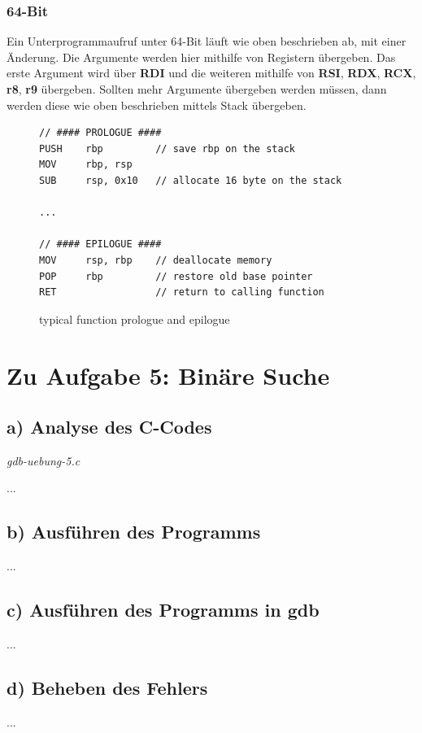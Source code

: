 \documentclass[12pt]{article}
\begin{document}
\subsubsection*{64-Bit}
Ein Unterprogrammaufruf unter 64-Bit läuft wie oben beschrieben ab, mit einer Änderung. Die Argumente werden hier mithilfe von Registern übergeben. Das erste Argument wird über \textbf{RDI} und die weiteren mithilfe von \textbf{RSI}, \textbf{RDX}, \textbf{RCX}, \textbf{r8}, \textbf{r9} übergeben. Sollten mehr Argumente übergeben werden müssen, dann werden diese wie oben beschrieben mittels Stack übergeben.


\begin{figure}[h]
\begin{lstlisting}
// #### PROLOGUE ####
PUSH	rbp			// save rbp on the stack
MOV		rbp, rsp
SUB		rsp, 0x10	// allocate 16 byte on the stack

...

// #### EPILOGUE ####
MOV		rsp, rbp	// deallocate memory
POP		rbp			// restore old base pointer
RET					// return to calling function
\end{lstlisting}
\label{lst:epipro}
\caption{typical function prologue and epilogue}
\end{figure}


\newpage
\section{Zu Aufgabe 5: Binäre Suche}
\subsection{a) Analyse des C-Codes}
\textit{gdb-uebung-5.c}


...

\subsection{b) Ausführen des Programms}
...


\subsection{c) Ausführen des Programms in gdb}
...

\subsection{d) Beheben des Fehlers}
...
\end{document}
